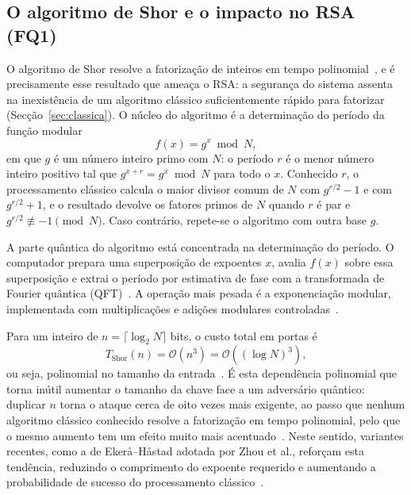 \documentclass[11pt,a4paper]{article}
\begin{document}
\subsection{O algoritmo de Shor e o impacto no RSA (FQ1)}\label{sec:shor}

O algoritmo de Shor resolve a fatorização de inteiros em tempo polinomial~\cite{wang2022}, e é precisamente esse resultado que ameaça o RSA: a segurança do sistema assenta na inexistência de um algoritmo clássico suficientemente rápido para fatorizar (Secção~\ref{sec:classica}). O núcleo do algoritmo é a determinação do período da função modular
\begin{equation}\label{eq:periodo}
f(x) = g^{x} \bmod N,
\end{equation}
em que $g$ é um número inteiro primo com $N$: o período $r$ é o menor número inteiro positivo tal que $g^{x+r} = g^{x} \bmod N$ para todo o $x$. Conhecido $r$, o processamento clássico calcula o maior divisor comum de $N$ com $g^{r/2}-1$ e com $g^{r/2}+1$, e o resultado devolve os fatores primos de $N$ quando $r$ é par e $g^{r/2} \not\equiv -1 \pmod{N}$. Caso contrário, repete-se o algoritmo com outra base $g$.

A parte quântica do algoritmo está concentrada na determinação do período. O computador prepara uma superposição de expoentes $x$, avalia $f(x)$ sobre essa superposição e extrai o período por estimativa de fase com a transformada de Fourier quântica (QFT)~\cite{zhou2025}. A operação mais pesada é a exponenciação modular, implementada com multiplicações e adições modulares controladas~\cite{oonishi2026,luongo2025}.

Para um inteiro de $n = \lceil \log_{2} N \rceil$ bits, o custo total em portas é
\begin{equation}\label{eq:shor}
T_{\text{Shor}}(n) = \mathcal{O}(n^{3}) = \mathcal{O}\!\left((\log N)^{3}\right),
\end{equation}
ou seja, polinomial no tamanho da entrada~\cite{wang2022,zhou2025}. É esta dependência polinomial que torna inútil aumentar o tamanho da chave face a um adversário quântico: duplicar $n$ torna o ataque cerca de oito vezes mais exigente, ao passo que nenhum algoritmo clássico conhecido resolve a fatorização em tempo polinomial, pelo que o mesmo aumento tem um efeito muito mais acentuado~\cite{zhou2025}. Neste sentido, variantes recentes, como a de Ekerå--Håstad adotada por Zhou et al., reforçam esta tendência, reduzindo o comprimento do expoente requerido e aumentando a probabilidade de sucesso do processamento clássico~\cite{zhou2025}.
\end{document}
